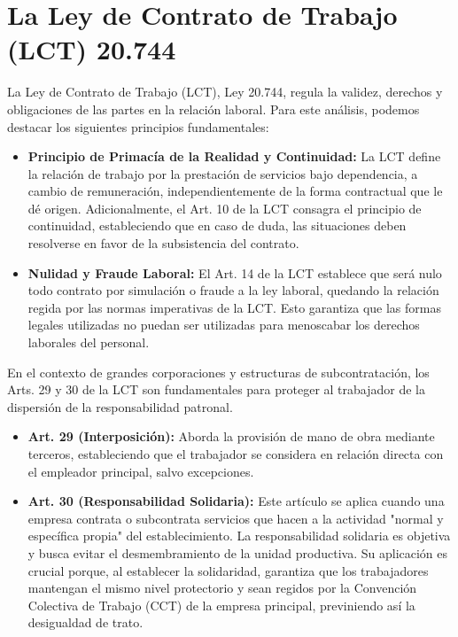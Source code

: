 \documentclass[]{informeutn}
\begin{document}
  \section{La Ley de Contrato de Trabajo (LCT) 20.744}
    La Ley de Contrato de Trabajo (LCT), Ley 20.744, regula la validez, derechos y obligaciones de las partes en la
    relación laboral. Para este análisis, podemos destacar los siguientes principios fundamentales:
    \begin{itemize}
      \item \textbf{Principio de Primacía de la Realidad y Continuidad:} La LCT define la relación de trabajo por la
        prestación de servicios bajo dependencia, a cambio de remuneración, independientemente de la forma contractual
        que le dé origen. Adicionalmente, el Art. 10 de la LCT consagra el principio de continuidad, estableciendo que
        en caso de duda, las situaciones deben resolverse en favor de la subsistencia del contrato.
      \item \textbf{Nulidad y Fraude Laboral:} El Art. 14 de la LCT establece que será nulo todo contrato por simulación
        o fraude a la ley laboral, quedando la relación regida por las normas imperativas de la LCT. Esto garantiza que
        las formas legales utilizadas no puedan ser utilizadas para menoscabar los derechos laborales del personal.
    \end{itemize}

    En el contexto de grandes corporaciones y estructuras de subcontratación, los Arts. 29 y 30 de la LCT son
    fundamentales para proteger al trabajador de la dispersión de la responsabilidad patronal.
    \begin{itemize}
      \item \textbf{Art. 29 (Interposición):} Aborda la provisión de mano de obra mediante terceros, estableciendo que
        el trabajador se considera en relación directa con el empleador principal, salvo excepciones.
      \item \textbf{Art. 30 (Responsabilidad Solidaria):} Este artículo se aplica cuando una empresa contrata o
        subcontrata servicios que hacen a la actividad "normal y específica propia" del establecimiento. La
        responsabilidad solidaria es objetiva y busca evitar el desmembramiento de la unidad productiva. Su aplicación
        es crucial porque, al establecer la solidaridad, garantiza que los trabajadores mantengan el mismo nivel
        protectorio y sean regidos por la Convención Colectiva de Trabajo (CCT) de la empresa principal, previniendo así
        la desigualdad de trato.
    \end{itemize}
\end{document}
